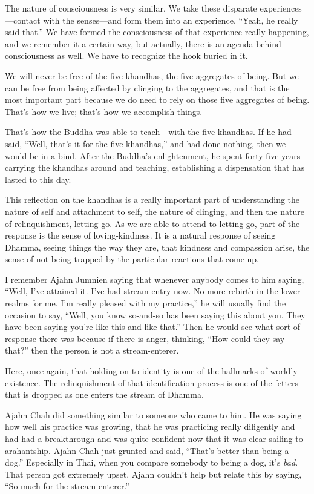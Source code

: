 The nature of consciousness is very similar. We take these disparate
experiences—contact with the senses—and form them into an experience.
“Yeah, he really said that.” We have formed the consciousness of that
experience really happening, and we remember it a certain way, but
actually, there is an agenda behind consciousness as well. We have to
recognize the hook buried in it.

We will never be free of the five khandhas, the five aggregates of
being. But we can be free from being affected by clinging to the
aggregates, and that is the most important part because we do need to
rely on those five aggregates of being. That’s how we live; that’s how
we accomplish things.

That’s how the Buddha was able to teach—with the five khandhas. If he
had said, “Well, that’s it for the five khandhas,” and had done nothing,
then we would be in a bind. After the Buddha’s enlightenment, he spent
forty-five years carrying the khandhas around and teaching, establishing
a dispensation that has lasted to this day.

This reflection on the khandhas is a really important part of
understanding the nature of self and attachment to self, the nature of
clinging, and then the nature of relinquishment, letting go. As we are
able to attend to letting go, part of the response is the sense of
loving-kindness. It is a natural response of seeing Dhamma, seeing
things the way they are, that kindness and compassion arise, the sense
of not being trapped by the particular reactions that come up.

I remember Ajahn Jumnien saying that whenever anybody comes to him
saying, “Well, I’ve attained it. I’ve had stream-entry now. No more
rebirth in the lower realms for me. I’m really pleased with my
practice,” he will usually find the occasion to say, “Well, you know
so-and-so has been saying this about you. They have been saying you’re
like this and like that.” Then he would see what sort of response there
was because if there is anger, thinking, “How could they say that?” then
the person is not a stream-enterer.

Here, once again, that holding on to identity is one of the hallmarks of
worldly existence. The relinquishment of that identification process is
one of the fetters that is dropped as one enters the stream of Dhamma.

Ajahn Chah did something similar to someone who came to him. He was
saying how well his practice was growing, that he was practicing really
diligently and had had a breakthrough and was quite confident now that
it was clear sailing to arahantship. Ajahn Chah just grunted and said,
“That’s better than being a dog.” Especially in Thai, when you compare
somebody to being a dog, it’s \emph{bad}. That person got extremely
upset. Ajahn couldn’t help but relate this by saying, “So much for the
stream-enterer.”

